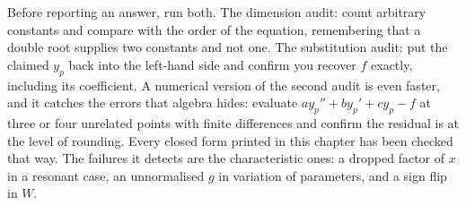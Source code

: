 \begin{keynote}
Before reporting an answer, run both. The dimension audit: count arbitrary constants and compare with the order of the equation, remembering that a double root supplies two constants and not one. The substitution audit: put the claimed $y_p$ back into the left-hand side and confirm you recover $f$ exactly, including its coefficient. A numerical version of the second audit is even faster, and it catches the errors that algebra hides: evaluate $ay_p''+by_p'+cy_p-f$ at three or four unrelated points with finite differences and confirm the residual is at the level of rounding. Every closed form printed in this chapter has been checked that way. The failures it detects are the characteristic ones: a dropped factor of $x$ in a resonant case, an unnormalised $g$ in variation of parameters, and a sign flip in $W$.
\end{keynote}

